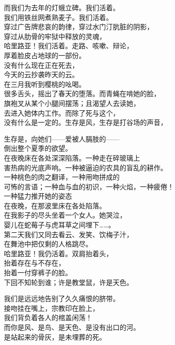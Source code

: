 \documentclass{article}
\begin{document}
而我们为去年的灯蛾立碑。我们活着。\\
我们用铁丝网煮熟麦子。我们活着。\\
穿过广告牌悲哀的韵律，穿过水门汀肮脏的阴影，\\
穿过从肋骨的牢狱中释放的灵魂，\\
哈里路亚！我们活着。走路、咳嗽、辩论，\\
厚着脸皮占地球的一部份。\\
没有什么现在正在死去，
\\
今天的云抄袭昨天的云。 \\ 


在三月我听到樱桃的吆喝。\\
很多舌头，摇出了春天的堕落。而青蝇在啃她的脸，\\
旗袍叉从某个小腿间摆荡；且渴望人去读她，\\
去进入她体内工作。而除了死与这个，\\
没有什么是一定的。生存是风，生存是打谷场的声音，\\
\newpage

生存是，向她们——爱被人膈肢的——
\\
倒出整个夏季的欲望。 \\ 


在夜晚床在各处深深陷落。一种走在碎玻璃上\\
害热病的光底声响。一种被逼迫的农具的盲乱的耕作。\\
一种桃色的肉之翻译，一种用吻拼成的\\
可怖的言语；一种血与血的初识，一种火焰，一种疲倦！\\
一种猛力推开她的姿态
\\
在夜晚，在那波里床在各处陷落。 \\ 


在我影子的尽头坐着一个女人。她哭泣，\\
婴儿在蛇莓子与虎耳草之间埋下……。\\
第二天我们又同去看云、发笑、饮梅子汁，\\
在舞池中把仅剩的人格跳尽。\\
哈里路亚！我仍活着。双肩抬着头，\\
抬着存在与不存在，
\\
抬着一付穿裤子的脸。 \\ 


下回不知轮到谁；许是教堂鼠，许是天色。\\
\newpage

我们是远远地告别了久久痛恨的脐带。\\
接吻挂在嘴上，宗教印在脸上，\\
我们背负着各人的棺盖闲荡！\\
而你是风、是鸟、是天色、是没有出口的河。
\\
是站起来的骨灰，是未埋葬的死。 \\ 
\end{document}
